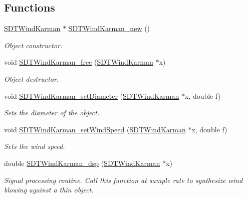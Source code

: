 \subsection*{Functions}
\begin{DoxyCompactItemize}
\item 
\hyperlink{group__windkarman_ga80be8ba31406840ae33d6a97e0cad1b1}{S\+D\+T\+Wind\+Karman} $\ast$ \hyperlink{group__windkarman_gaa79063d645c1f21fad8c5a819ad78996}{S\+D\+T\+Wind\+Karman\+\_\+new} ()
\begin{DoxyCompactList}\small\item\em Object constructor. \end{DoxyCompactList}\item 
void \hyperlink{group__windkarman_gab2485afd8530db883dec772e2d797f93}{S\+D\+T\+Wind\+Karman\+\_\+free} (\hyperlink{group__windkarman_ga80be8ba31406840ae33d6a97e0cad1b1}{S\+D\+T\+Wind\+Karman} $\ast$x)
\begin{DoxyCompactList}\small\item\em Object destructor. \end{DoxyCompactList}\item 
void \hyperlink{group__windkarman_ga347782dade60398f65e40ecba6533513}{S\+D\+T\+Wind\+Karman\+\_\+set\+Diameter} (\hyperlink{group__windkarman_ga80be8ba31406840ae33d6a97e0cad1b1}{S\+D\+T\+Wind\+Karman} $\ast$x, double f)
\begin{DoxyCompactList}\small\item\em Sets the diameter of the object. \end{DoxyCompactList}\item 
void \hyperlink{group__windkarman_ga5180e7a0c805236099e8b253d3774b2d}{S\+D\+T\+Wind\+Karman\+\_\+set\+Wind\+Speed} (\hyperlink{group__windkarman_ga80be8ba31406840ae33d6a97e0cad1b1}{S\+D\+T\+Wind\+Karman} $\ast$x, double f)
\begin{DoxyCompactList}\small\item\em Sets the wind speed. \end{DoxyCompactList}\item 
double \hyperlink{group__windkarman_gaea472085b6034ca075c6be100086b97f}{S\+D\+T\+Wind\+Karman\+\_\+dsp} (\hyperlink{group__windkarman_ga80be8ba31406840ae33d6a97e0cad1b1}{S\+D\+T\+Wind\+Karman} $\ast$x)
\begin{DoxyCompactList}\small\item\em Signal processing routine. Call this function at sample rate to synthesize wind blowing against a thin object. \end{DoxyCompactList}\end{DoxyCompactItemize}


